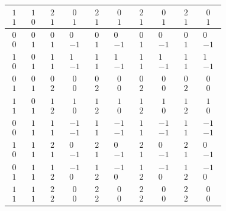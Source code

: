 \documentclass[11pt]{article}
\providecommand{\chpair}[2]{\begin{smallmatrix}#1\\#2\end{smallmatrix}}
\begin{document}
{\begin{tabular}{|cc||cc|cc|cc|cc|}
$\chpair{1}{1}$ & $\chpair{1}{0}$ & $\chpair{2}{1}$ & $\chpair{0}{1}$ & $\chpair{2}{1}$ & $\chpair{0}{1}$ & $\chpair{2}{1}$ & $\chpair{0}{1}$ & $\chpair{2}{1}$ & $\chpair{0}{1}$\\
\hline
$\chpair{0}{0}$ & $\chpair{0}{1}$ & $\chpair{0}{1}$ & $\chpair{0}{-1}$ & $\chpair{0}{1}$ & $\chpair{0}{-1}$ & $\chpair{0}{1}$ & $\chpair{0}{-1}$ & $\chpair{0}{1}$ & $\chpair{0}{-1}$\\
$\chpair{1}{0}$ & $\chpair{0}{1}$ & $\chpair{1}{1}$ & $\chpair{1}{-1}$ & $\chpair{1}{1}$ & $\chpair{1}{-1}$ & $\chpair{1}{1}$ & $\chpair{1}{-1}$ & $\chpair{1}{1}$ & $\chpair{1}{-1}$\\
$\chpair{0}{1}$ & $\chpair{0}{1}$ & $\chpair{0}{2}$ & $\chpair{0}{0}$ & $\chpair{0}{2}$ & $\chpair{0}{0}$ & $\chpair{0}{2}$ & $\chpair{0}{0}$ & $\chpair{0}{2}$ & $\chpair{0}{0}$\\
$\chpair{1}{1}$ & $\chpair{0}{1}$ & $\chpair{1}{2}$ & $\chpair{1}{0}$ & $\chpair{1}{2}$ & $\chpair{1}{0}$ & $\chpair{1}{2}$ & $\chpair{1}{0}$ & $\chpair{1}{2}$ & $\chpair{1}{0}$\\
\hline
$\chpair{0}{0}$ & $\chpair{1}{1}$ & $\chpair{1}{1}$ & $\chpair{-1}{-1}$ & $\chpair{1}{1}$ & $\chpair{-1}{-1}$ & $\chpair{1}{1}$ & $\chpair{-1}{-1}$ & $\chpair{1}{1}$ & $\chpair{-1}{-1}$\\
$\chpair{1}{0}$ & $\chpair{1}{1}$ & $\chpair{2}{1}$ & $\chpair{0}{-1}$ & $\chpair{2}{1}$ & $\chpair{0}{-1}$ & $\chpair{2}{1}$ & $\chpair{0}{-1}$ & $\chpair{2}{1}$ & $\chpair{0}{-1}$\\
$\chpair{0}{1}$ & $\chpair{1}{1}$ & $\chpair{1}{2}$ & $\chpair{-1}{0}$ & $\chpair{1}{2}$ & $\chpair{-1}{0}$ & $\chpair{1}{2}$ & $\chpair{-1}{0}$ & $\chpair{1}{2}$ & $\chpair{-1}{0}$\\
$\chpair{1}{1}$ & $\chpair{1}{1}$ & $\chpair{2}{2}$ & $\chpair{0}{0}$ & $\chpair{2}{2}$ & $\chpair{0}{0}$ & $\chpair{2}{2}$ & $\chpair{0}{0}$ & $\chpair{2}{2}$ & $\chpair{0}{0}$\\
\hline
\end{tabular}}
\endgroup

\medskip
\end{document}
